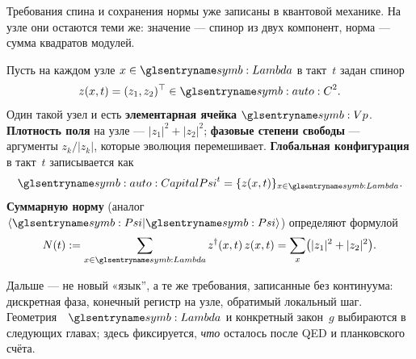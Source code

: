 Требования спина и сохранения нормы уже записаны в квантовой механике.
На узле они остаются теми же:
значение --- спинор из двух компонент, норма --- сумма квадратов модулей.

\begin{definition}
\label{def:field-a3}
Пусть на каждом узле $x\in\carrierLattice$ в такт~$t$ задан спинор
\[
  z(x,t)=(z_1,z_2)^\top\in\spaceC^2.
\]
Один такой узел и есть \textbf{элементарная ячейка} $\caPlanckCell$.
\textbf{Плотность поля} на узле --- $|z_1|^2+|z_2|^2$;
\textbf{фазовые степени свободы} --- аргументы $z_k/|z_k|$, которые эволюция перемешивает.
\textbf{Глобальная конфигурация} в такт~$t$ записывается как
\[
  \symCapitalPsi^t=\{z(x,t)\}_{x\in\carrierLattice}.
\]
\textbf{Суммарную норму} (аналог $\langle\wavePsi|\wavePsi\rangle$) определяют формулой
\[
  N(t):=\sum_{x\in\carrierLattice} z^\dagger(x,t)\,z(x,t)=\sum_x\bigl(|z_1|^2+|z_2|^2\bigr).
\]
\end{definition}

Дальше --- не новый «язык'', а те же требования, записанные без континуума:
дискретная фаза, конечный регистр на узле, обратимый локальный шаг.
Геометрия~\latGCK\ $\carrierLattice$ и конкретный закон~$g$ выбираются в следующих главах;
здесь фиксируется, \emph{что} осталось после QED и планковского счёта.

